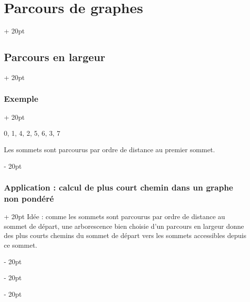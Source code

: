 \documentclass[a4paper, 12pt, twoside]{article}
\newcommand{\ind}[1][20pt]{\advance\leftskip + #1}
\newcommand{\deind}[1][20pt]{\advance\leftskip - #1}
\newenvironment{indt}[2][20pt]{#2 \par \ind[#1]}{\par \deind} %
\begin{document}
\begin{indt}{\section{Parcours de graphes}}
\begin{indt}{\subsection{Parcours en largeur}}
            \begin{indt}{\subsubsection{Exemple}}
                \begin{center}
                \end{center}

                0, 1, 4, 2, 5, 6, 3, 7

                Les sommets sont parcourus par ordre de distance au premier sommet.
            \end{indt}

            \vspace{12pt}
            
            \begin{indt}{\subsubsection{Application : calcul de plus court chemin dans un graphe non pondéré}}
                Idée : comme les sommets sont parcourus par ordre de distance au sommet de départ, une arborescence bien choisie d'un parcours en largeur donne des plus courts chemins du sommet de départ vers les sommets accessibles depuis ce sommet.

                \begin{center}
\end{center}
\end{indt}
\end{indt}
\end{indt}
\end{document}
